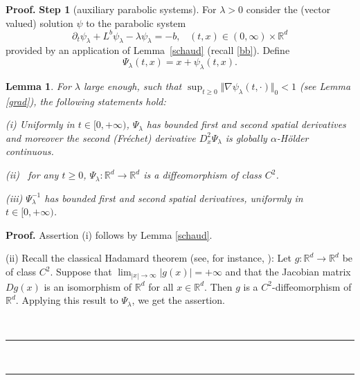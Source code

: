 \documentclass[a4paper,10pt]{article}
\newtheorem{lemma}[theorem]{Lemma}
\newenvironment{proof}[1][Proof]{\textbf{#1.} }{\ \rule{0.5em}{0.5em}}
\begin{document}
\begin{proof}
\textbf{Step 1} (auxiliary parabolic systems). For $\lambda>0$ consider the
(vector valued) solution $\psi$ to the parabolic system
 \begin{equation} \label{pde}
\partial_{t}\psi_{\lambda}+L^{b}\psi_{\lambda}-\lambda\psi_{\lambda
}=-b,\;\;\;(t,x)\in(0,\infty)\times{\mathbb{R}}^{d}%
\end{equation}
provided by an application of Lemma~\ref{schaud} (recall
\eqref{bb}). Define
\[
\Psi_{\lambda}(t,x)=x+\psi_{\lambda}(t,x).
\]

\begin{lemma} \label{diff} For  $\lambda $ large enough, such that
 $\sup_{t\geq0}\Vert \nabla \psi_{\lambda}(t,\cdot)\Vert_{0} <1$ (see
 Lemma \ref{grad}),
 the following statements hold:

{{\vskip 2mm \noindent }} (i) Uniformly in $t \in [0,+\infty)$,
$\Psi_{\lambda}$ has bounded first and second spatial
 derivatives and moreover  the second (Fr\'echet) derivative $D^2_x
\Psi_{\lambda}$ is globally $\alpha$-H\"older continuous.


{{\vskip 2mm \noindent }} (ii) \ for any  $t \ge 0$,
 $\Psi_{\lambda} : \mathbb{R} ^d \to \mathbb{R} ^d$ is a diffeomorphism of class $C^2$.

{{\vskip 2mm \noindent }} (iii)  $\Psi_{\lambda}^{-1}$ has bounded
first and second spatial
 derivatives, uniformly in $t \in [0,+\infty)$.
\end{lemma}

\begin{proof} Assertion (i) follows by Lemma \ref{schaud}.

\vskip 2mm (ii) Recall the classical Hadamard theorem (see, for
instance, \cite[page 330]{protter}): Let $g : \mathbb{R} ^d \to
\mathbb{R} ^d$  be of class $C^2.$ Suppose that $\lim_{|x| \to
\infty} |g(x) | = + \infty$ and that the Jacobian matrix $Dg(x)$
is an isomorphism of $\mathbb{R} ^d$ for all $x \in \mathbb{R}
^d$. Then $g$ is a
 $C^2$-diffeomorphism of $\mathbb{R} ^d$.
Applying this result to $\Psi_{\lambda}$, we get the assertion.




\end{proof}
\end{proof}
\end{document}
